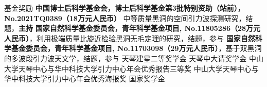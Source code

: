 \begin{rubric}{基金奖励}
    \entry*[2021 -- 2023] \textbf{中国博士后科学基金会，博士后科学基金第3批特别资助（站前），No.2021TQ0389（18万元人民币）}
    中等质量黑洞的空间引力波探测研究，结题，\textbf{主持}
    \entry*[2019 -- 2021] \textbf{国家自然科学基金委员会，青年科学基金项目,
    No.11805286（28万元人民币）}，利用极端质量比旋近检验黑洞无毛定理的研究，结题，参与 
    \entry*[2018 -- 2020] \textbf{国家自然科学基金委员会，青年科学基金项目,
    No.11703098（29万元人民币）}，基于双黑洞的多波段引力波天文学，结题，参与 
%
    \entry*[2020] 天琴建星二等奖学金
    \entry*[2019] 天琴中大请奖学金
    \entry*[2019] 中山大学天琴中心与华中科技大学引力中心年会优秀报告三等奖 
    \entry*[2018] 中山大学天琴中心与华中科技大学引力中心年会优秀海报奖
    \entry*[2015] 国家奖学金
\end{rubric}
